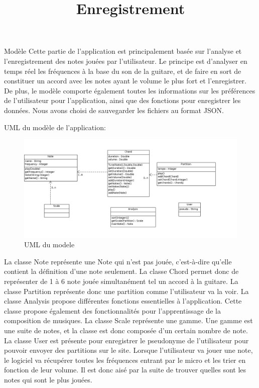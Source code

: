 \documentclass{article}
\title{Enregistrement}
\begin{document}
Modèle\newline
Cette partie de l'application est principalement basée sur l'analyse et l'enregistrement des notes jouées par 
l'utilisateur. Le principe est d'analyser en temps réel les fréquences à la base du son de la guitare, et de faire en sort de constituer un accord
avec les notes ayant le volume le plus fort et l'enregistrer. De plus, le modèle comporte également toutes les informations sur les préférences
de l'utilisateur pour l'application,   ainsi que des fonctions pour enregistrer les données. Nous avons choisi de sauvegarder les fichiers au format JSON.\newline

UML du modèle de l'application:
\begin{figure}[H]
\centering
\includegraphics[scale=0.5]{ModelUML}
\caption{UML du modele}
\end{figure}

La classe Note représente une Note qui n'est pas jouée, c'est-à-dire qu'elle contient la définition d'une note seulement.\newline
La classe Chord permet donc de représenter de 1 à 6 note jouée simultanément tel un accord à la guitare.\newline
La classe Partition représente donc une partition comme l'utilisateur va la voir.\newline
La classe Analysis propose différentes fonctions essentielles à l'application. Cette classe propose également des fonctionnalités pour l'apprentissage de la composition de musiques.\newline
La classe Scale représente une gamme. Une gamme est une suite de notes, et la classe est donc composée d'un certain nombre de note.
La classe User est présente pour enregistrer le pseudonyme de l'utilisateur pour pouvoir envoyer des partitions sur le site.
Lorsque l'utilisateur va jouer une note, le logiciel va récupérer toutes les fréquences entrant par le micro et les trier en fonction de leur volume. Il est donc aisé par la suite de trouver quelles sont les notes qui sont le plus jouées.
\end{document}
